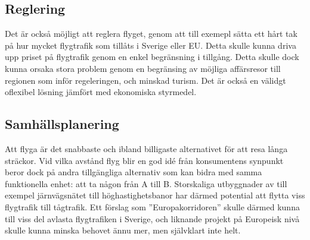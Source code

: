 \documentclass{article}
\begin{document}
\subsection{Reglering}

Det är också möjligt att reglera flyget, genom att till exemepl sätta ett hårt tak på hur mycket flygtrafik som tillåts i Sverige eller EU. Detta skulle kunna driva upp priset på flygtrafik genom en enkel begränsning i tillgång. Detta skulle dock kunna orsaka stora problem genom en begränsing av möjliga affärsresor till regionen som inför regeleringen, och minskad turism. Det är också en välidgt oflexibel lösning jämfört med ekonomiska styrmedel.

\subsection{Samhällsplanering}

Att flyga är det snabbaste och ibland billigaste alternativet för att resa långa sträckor. Vid vilka avstånd flyg blir en god idé från konsumentens synpunkt beror dock på andra tillgängliga alternativ som kan bidra med samma funktionella enhet: att ta någon från A till B. Storskaliga utbyggnader av till exempel järnvägsnätet till höghastighetsbanor har därmed potential att flytta viss flygtrafik till tågtrafik. Ett förslag som ''Europakorridoren''  skulle därmed kunna till viss del avlasta flygtrafiken i Sverige, och liknande projekt på Europeisk nivå skulle kunna minska behovet ännu mer, men självklart inte helt.
\end{document}

